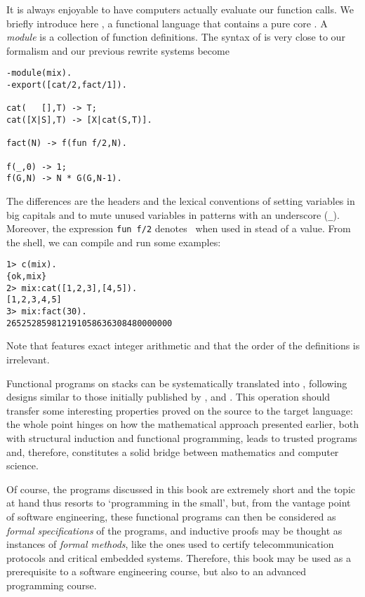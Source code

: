 
It is always enjoyable to have computers actually evaluate our
function calls. We briefly introduce here \Erlang, a functional
language that contains a pure core \citep{Armstrong_2007}. A
\emph{module} is a collection of function definitions. The syntax of
\Erlang is very close to our formalism and our previous rewrite
systems become
\begin{verbatim}
-module(mix).
-export([cat/2,fact/1]).

cat(   [],T) -> T;
cat([X|S],T) -> [X|cat(S,T)].

fact(N) -> f(fun f/2,N).

f(_,0) -> 1;
f(G,N) -> N * G(G,N-1).
\end{verbatim}
The differences are the headers and the lexical conventions of setting
variables in big capitals and to mute unused variables in patterns
with an underscore (\verb|_|). Moreover, the expression \verb|fun f/2|
denotes~ when used in stead of a value. From the \Erlang
shell, we can compile and run some examples:
\begin{verbatim}
1> c(mix).
{ok,mix}
2> mix:cat([1,2,3],[4,5]).
[1,2,3,4,5]
3> mix:fact(30).
265252859812191058636308480000000
\end{verbatim}
Note that \Erlang features exact integer arithmetic and that the order
of the definitions is irrelevant.

\label{par:java}

Functional programs on stacks can be systematically translated into
\Java, following designs similar to those initially published
by \cite{FelleisenFriedman_1997}, \cite{Bloch_2003}
and \cite{Sher_2004}. This operation should transfer some interesting
properties proved on the source to the target language: the whole
point hinges on how the mathematical approach presented earlier, both
with structural induction and functional programming, leads to trusted
\Java programs and, therefore, constitutes a solid bridge between
mathematics and computer science.

Of course, the programs discussed in this book are extremely short and
the topic at hand thus resorts to `programming in the small', but,
from the vantage point of software engineering, these functional
programs can then be considered as \emph{formal specifications} of the
\Java programs, and inductive proofs may be thought as instances of
\emph{formal methods}, like the ones used to certify telecommunication
protocols and critical embedded systems. Therefore, this book may be
used as a prerequisite to a software engineering course, but also to
an advanced programming course.

